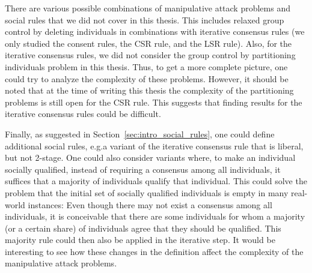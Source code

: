 \documentclass[
    12pt,               %
    a4paper,            %
    bibtotoc,           %
    pointlessnumbers,   %
    ngerman,            %
    titlepage,          %
    leqno,              %
    ]{scrarticle}       %
\newcommand\secref{Section~\ref}
\begin{document}
There are various possible combinations of manipulative attack problems and social rules that we did not cover in this thesis. This includes relaxed group control by deleting individuals in combinations with iterative consensus rules (we only studied the consent rules, the CSR rule, and the LSR rule). Also, for the iterative consensus rules, we did not consider the group control by partitioning individuals problem in this thesis. Thus, to get a more complete picture, one could try to analyze the complexity of these problems. However, it should be noted that at the time of writing this thesis the complexity of the partitioning problems is still open for the CSR rule. This suggests that finding results for the iterative consensus rules could be difficult.

Finally, as suggested in \secref{sec:intro_social_rules}, one could define additional social rules, e.g.\@ a variant of the iterative consensus rule that is liberal, but not 2-stage. One could also consider variants where, to make an individual socially qualified, instead of requiring a consensus among all individuals, it suffices that a majority of individuals qualify that individual. This could solve the problem that the initial set of socially qualified individuals is empty in many real-world instances: Even though there may not exist a consensus among all individuals, it is conceivable that there are some individuals for whom a majority (or a certain share) of individuals agree that they should be qualified. This majority rule could then also be applied in the iterative step. It would be interesting to see how these changes in the definition affect the complexity of the manipulative attack problems.










\clearpage
\nocite{*}
\printbibliography
\end{document}
